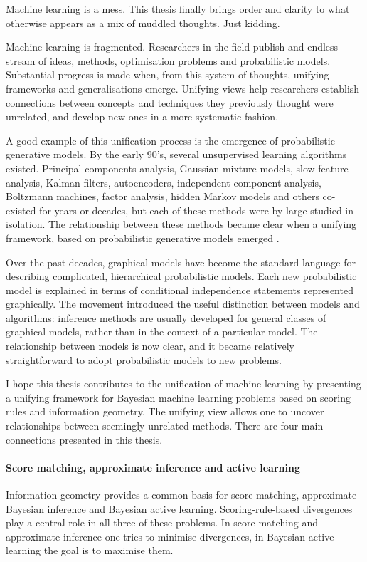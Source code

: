 
Machine learning is a mess. This thesis finally brings order and clarity to what otherwise appears as a mix of muddled thoughts. Just kidding.

Machine learning is fragmented. Researchers in the field publish and endless stream of ideas, methods, optimisation problems and probabilistic models. Substantial progress is made when, from this system of thoughts, unifying frameworks and generalisations emerge. Unifying views help researchers establish connections between concepts and techniques they previously thought were unrelated, and develop new ones in a more systematic fashion.

A good example of this unification process is the emergence of probabilistic generative models. By the early 90's, several unsupervised learning algorithms existed. Principal components analysis, Gaussian mixture models, slow feature analysis, Kalman-filters, autoencoders, independent component analysis, Boltzmann machines, factor analysis, hidden Markov models and others co-existed for years or decades, but each of these methods were by large studied in isolation. The relationship between these methods became clear when a unifying framework, based on probabilistic generative models emerged \citep{Lauritzen1996,Roweis1999,Tipping1999,Turner2007}.

Over the past decades, graphical models \citep{Lauritzen1996} have become the standard language for describing complicated, hierarchical probabilistic models. Each new probabilistic model is explained in terms of conditional independence statements represented graphically. The movement introduced the useful distinction between models and algorithms: inference methods are usually developed for general classes of graphical models, rather than in the context of a particular model. The relationship between models is now clear, and it became relatively straightforward to adopt probabilistic models to new problems.

I hope this thesis contributes to the unification of machine learning by presenting a unifying framework for Bayesian machine learning problems based on scoring rules and information geometry. The unifying view allows one to uncover relationships between seemingly unrelated methods. There are four main connections presented in this thesis.

\paragraph{Score matching, approximate inference and active learning} Information geometry provides a common basis for score matching, approximate Bayesian inference and Bayesian active learning. Scoring-rule-based divergences play a central role in all three of these problems. In score matching and approximate inference one tries to minimise divergences, in Bayesian active learning the goal is to maximise them.

